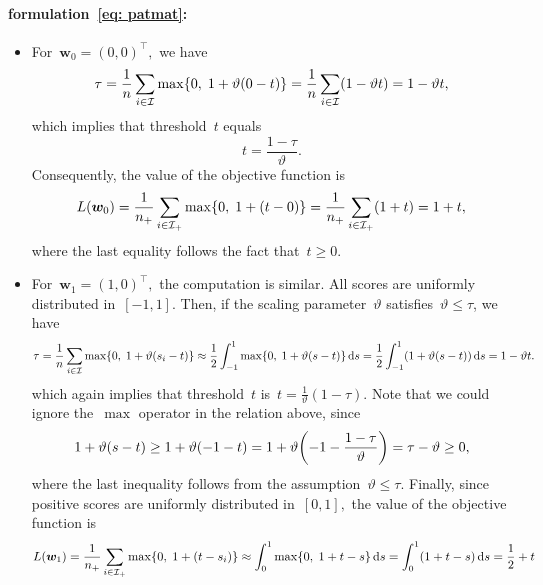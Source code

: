 \paragraph*{\PatMat formulation~\eqref{eq: patmat}:}
\begin{itemize}
  \item For~$\bm{w}_0 = (0,0)^{\top},$ we have
  \begin{equation*}
    \tau
    = \frac{1}{n}\sum_{i \in \I} \max\Brac[c]{0, \; 1 + \vartheta(0 - t)}
    = \frac{1}{n}\sum_{i \in \I} \Brac{1 - \vartheta t}
    = 1 - \vartheta t,
  \end{equation*}
  which implies that threshold~$t$ equals
  \begin{equation}\label{eq: PatMat threshold 0}
    t = \frac{1-\tau}{\vartheta}.
  \end{equation}
  Consequently, the value of the objective function is
  \begin{equation}\label{eq: PatMat objective 0}
    L(\bm{w}_0)
      = \frac{1}{\npos} \sum_{i \in \Ipos} \max\Brac[c]{0, \; 1 + (t - 0)}
      = \frac{1}{\npos} \sum_{i \in \Ipos} \Brac{1 + t}
      = 1 + t,
  \end{equation}
  where the last equality follows the fact that~$t \geq 0.$
  \item For~$\bm{w}_1 = (1,0)^{\top},$ the computation is similar. All scores are uniformly distributed in~$[-1,1].$ Then, if the scaling parameter~$\vartheta$ satisfies~$\vartheta \leq \tau$, we have
  \begin{equation*}
    \tau
      = \frac{1}{n} \sum_{i \in \I} \max\Brac[c]{0, \; 1 + \vartheta (s_i - t)}
      \approx \frac{1}{2} \int_{-1}^{1} \max\Brac[c]{0, \; 1 + \vartheta (s - t)} \dd{s}
      =\frac{1}{2} \int_{-1}^{1} (1+\vartheta(s - t))\dd{s}
      = 1 - \vartheta t.
  \end{equation*}
  which again implies that threshold~$t$ is~$t = \frac{1}{\vartheta}(1-\tau).$ Note that we could ignore the~$\max$ operator in the relation above, since 
  \begin{equation*}
    1 + \vartheta(s - t)
      \geq 1 + \vartheta(-1 - t)
      = 1 + \vartheta \Brac{-1 - \frac{1 - \tau}{\vartheta}}
      = \tau - \vartheta
      \geq 0,
  \end{equation*}
  where the last inequality follows from the assumption~$\vartheta \leq \tau.$ Finally, since positive scores are uniformly distributed in~$[0,1],$ the value of the objective function is
  \begin{equation*}
    L(\bm{w}_1)
      = \frac{1}{\npos} \sum_{i \in \Ipos} \max\Brac[c]{0, \; 1 + (t - s_i)}
      \approx \int_{0}^{1} \max\Brac[c]{0, \; 1 + t - s} \dd{s}
      = \int_{0}^{1} (1 + t - s)\dd{s}
      = \frac{1}{2} + t
  \end{equation*}
\end{itemize}

